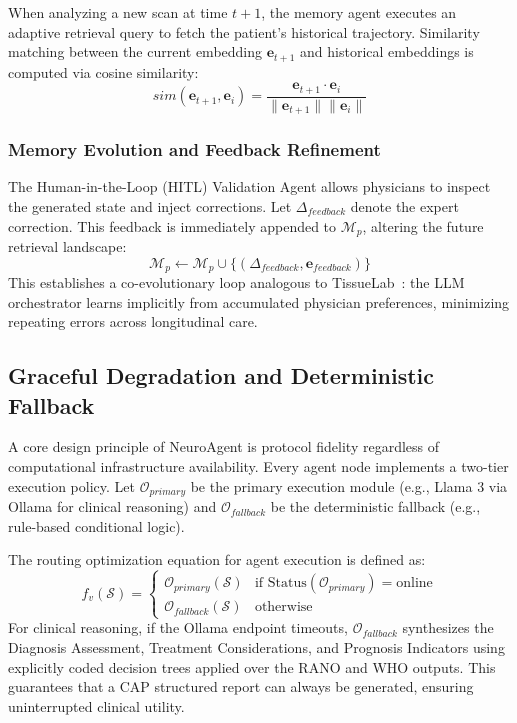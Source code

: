 When analyzing a new scan at time $t+1$, the memory agent executes an adaptive retrieval query to fetch the patient's historical trajectory. Similarity matching between the current embedding $\mathbf{e}_{t+1}$ and historical embeddings is computed via cosine similarity:
\begin{equation}
sim(\mathbf{e}_{t+1}, \mathbf{e}_i) = \frac{\mathbf{e}_{t+1} \cdot \mathbf{e}_i}{\|\mathbf{e}_{t+1}\| \|\mathbf{e}_i\|}
\end{equation}

\subsubsection{Memory Evolution and Feedback Refinement}
The Human-in-the-Loop (HITL) Validation Agent allows physicians to inspect the generated state and inject corrections. Let $\Delta_{feedback}$ denote the expert correction. This feedback is immediately appended to $\mathcal{M}_p$, altering the future retrieval landscape:
\begin{equation}
\mathcal{M}_p \leftarrow \mathcal{M}_p \cup \{ (\Delta_{feedback}, \mathbf{e}_{feedback}) \}
\end{equation}
This establishes a co-evolutionary loop analogous to TissueLab~\cite{tissuelab2025}: the LLM orchestrator learns implicitly from accumulated physician preferences, minimizing repeating errors across longitudinal care.

\subsection{Graceful Degradation and Deterministic Fallback}

A core design principle of NeuroAgent is protocol fidelity regardless of computational infrastructure availability. Every agent node implements a two-tier execution policy. Let $\mathcal{O}_{primary}$ be the primary execution module (e.g., Llama 3 via Ollama for clinical reasoning) and $\mathcal{O}_{fallback}$ be the deterministic fallback (e.g., rule-based conditional logic).

The routing optimization equation for agent execution is defined as:
\begin{equation}
f_v(\mathcal{S}) = 
\begin{cases} 
\mathcal{O}_{primary}(\mathcal{S}) & \text{if } \text{Status}(\mathcal{O}_{primary}) = \text{online} \\
\mathcal{O}_{fallback}(\mathcal{S}) & \text{otherwise}
\end{cases}
\end{equation}
For clinical reasoning, if the Ollama endpoint timeouts, $\mathcal{O}_{fallback}$ synthesizes the Diagnosis Assessment, Treatment Considerations, and Prognosis Indicators using explicitly coded decision trees applied over the RANO and WHO outputs. This guarantees that a CAP structured report can always be generated, ensuring uninterrupted clinical utility.

